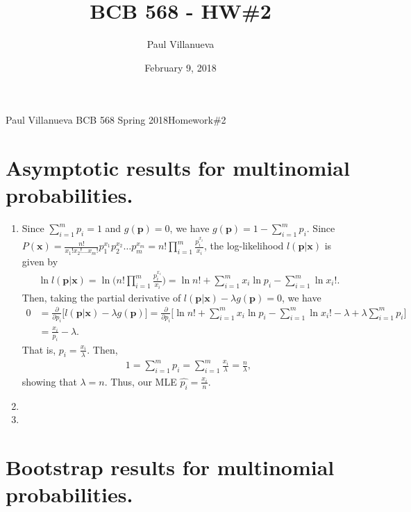 \documentclass[10pt]{article}
\begin{document}
 
\title{BCB 568 - HW\#2}
\author{Paul Villanueva}
\date{February 9, 2018}

Paul Villanueva \hfill BCB 568 Spring 2018\hfill Homework\#2

\hrulefill

    
\section*{Asymptotic results for multinomial probabilities.}

    \begin{enumerate}[label = \textbf{\alph*.}]
        \item Since $\sum_{i = 1}^m p_i = 1$ and $g(\bm{p}) = 0$, we have $g(\bm{p}) = 1 - \sum_{i = 1}^m p_i$.  Since $P(\bm{x}) = \frac{n!}{x_1!x_2!\dots x_m!}p_1^{x_1}p_2^{x_2}\dots p_m^{x_m} = n!\prod_{i = 1}^m \frac{p_i^{x_i}}{x_i}$, the log-likelihood $l(\bm{p} | \bm{x})$ is given by
            \begin{align*}
                \ln l(\bm{p} | \bm{x}) = \ln \Bigg(n!\prod_{i = 1}^m \frac{p_i^{x_i}}{x_i} \Bigg) = \ln{n!} + \sum_{i = 1}^m x_i\ln{p_i} - \sum_{i = 1}^m \ln{x_i!}.
            \end{align*}
        Then, taking the partial derivative of $l(\bm{p} | \bm{x}) - \lambda g(\bm{p}) = 0$, we have
            \begin{align*}
                0 &= \frac{\partial}{\partial p_i}\Bigg[l(\bm{p} | \bm{x}) - \lambda g(\bm{p})\Bigg] = \frac{\partial}{\partial p_i}\Bigg[\ln{n!} + \sum_{i = 1}^m x_i\ln{p_i} - \sum_{i = 1}^m \ln{x_i!} - \lambda + \lambda\sum_{i = 1}^mp_i\Bigg]\\
                &=\frac{x_i}{p_i} - \lambda.
            \end{align*}
        That is, $p_i = \frac{x_i}{\lambda}$.  Then,
            \begin{align*}
                1 = \sum_{i = 1}^m p_i = \sum_{i = 1}^m \frac{x_i}{\lambda} = \frac{n}{\lambda},
            \end{align*}
        showing that $\lambda = n$.    Thus, our MLE $\hat{p_i} = \frac{x_i}{n}$.
        \item 
        
        \item 
    \end{enumerate}

\section*{Bootstrap results for multinomial probabilities.}
\end{document}
